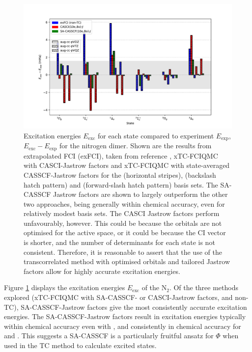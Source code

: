 \begin{figure}[htbp]
    \centering
    \includegraphics[width=\textwidth]{figures/binding/n2_exc}
    \caption{Excitation energies $E_\mathrm{exc}$ for each state compared to experiment $E_\mathrm{exp}$,\supercite{oddershedeComparison1985,huberConstants1979} $E_\mathrm{exc}-E_\mathrm{exp}$ for the nitrogen dimer. Shown are the results from extrapolated FCI (exFCI), taken from reference , xTC-FCIQMC with CASCI-Jastrow factors and xTC-FCIQMC with state-averaged CASSCF-Jastrow factors for the \avdz (horizontal stripes), \avtz (backslash hatch pattern) and \avqz (forward-slash hatch pattern) basis sets. The SA-CASSCF Jastrow factors are shown to largely outperform the other two approaches, being generally within chemical accuracy, even for relatively modest basis sets. The CASCI Jastrow factors perform unfavourably, however. This could be because the orbitals are not optimised for the active space, or it could be because the CI vector is shorter, and the number of determinants for each state is not consistent. Therefore, it is reasonable to assert that the use of the transcorrelated method with optimised orbitals and tailored Jastrow factors allow for highly accurate excitation energies.
        }
    \label{fig:n2-excite-relative}
\end{figure}

Figure \ref{fig:n2-excite-relative} displays the excitation energies $E_\mathrm{exc}$ of the N$_2$. Of the three methods explored (xTC-FCIQMC with SA-CASSCF- or CASCI-Jastrow factors, and non-TC), SA-CASSCF-Jastrow factors give the most consistently accurate excitation energies. The SA-CASSCF-Jastrow factors result in excitation energies typically within chemical accuracy even with \avdz, and consistently in chemical accuracy for \avtz and \avqz. This suggests a SA-CASSCF is a particularly fruitful ansatz for $\Phi$ when used in the TC method to calculate excited states.

